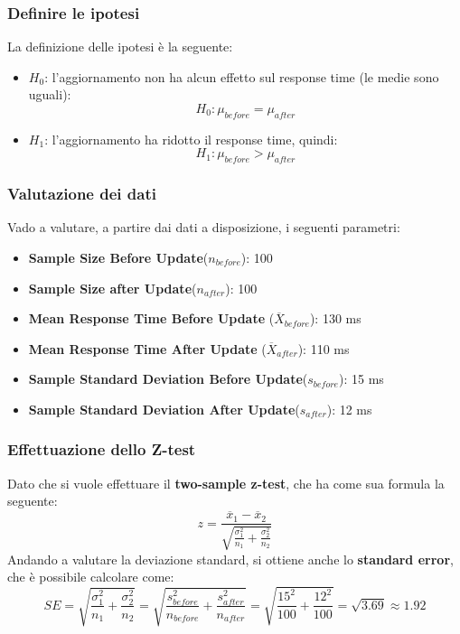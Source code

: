 \subsubsection{Definire le ipotesi}
La definizione delle ipotesi è la seguente:
\begin{itemize}
    \item \(H_0\): l'aggiornamento non ha alcun effetto sul response time (le medie sono uguali):
    \[
    H_0: \mu_{before} = \mu_{after}
    \]

    \item \(H_1\): l'aggiornamento ha ridotto il response time, quindi:
    \[
    H_1: \mu_{before} > \mu_{after}
    \]

\end{itemize}

\subsubsection{Valutazione dei dati}
Vado a valutare, a partire dai dati a disposizione, i seguenti parametri:
\begin{itemize}
    \item \textbf{Sample Size Before Update}(\(n_{before}\)): 100
    \item \textbf{Sample Size after Update}(\(n_{after}\)): 100
    \item \textbf{Mean Response Time Before Update} (\(\overline{X}_{before}\)): 130 ms
    \item \textbf{Mean Response Time After Update} (\(\overline{X}_{after}\)): 110 ms
    \item \textbf{Sample Standard Deviation Before Update}(\(s_{before}\)): 15 ms
    \item \textbf{Sample Standard Deviation After Update}(\(s_{after}\)): 12 ms
\end{itemize}

\subsubsection{Effettuazione dello Z-test}
Dato che si vuole effettuare il \textbf{two-sample z-test}, che ha come sua formula la seguente:
\[
z = \frac{\overline{x}_1 - \overline{x}_2}{\sqrt{\frac{\sigma_1^2}{n_1} + \frac{\sigma_2^2}{n_2}}}
\]
Andando a valutare la deviazione standard, si ottiene anche lo \textbf{standard error}, che è possibile calcolare come:
\[
SE = \sqrt{\frac{\sigma_1^2}{n_1} + \frac{\sigma_2^2}{n_2}} = \sqrt{\frac{s_{before}^2}{n_{before}} + \frac{s_{after}^2}{n_{after}}} = \sqrt{\frac{15^2}{100} + \frac{12^2}{100}} = \sqrt{3.69} \approx 1.92
\]

